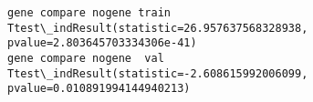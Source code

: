 \documentclass[11pt]{article}
\begin{document}
    \begin{Verbatim}[commandchars=\\\{\}]
gene compare nogene train Ttest\_indResult(statistic=26.957637568328938, pvalue=2.803645703334306e-41)
gene compare nogene  val Ttest\_indResult(statistic=-2.608615992006099, pvalue=0.010891994144940213)

    \end{Verbatim}


    
    
    
    
\end{document}
